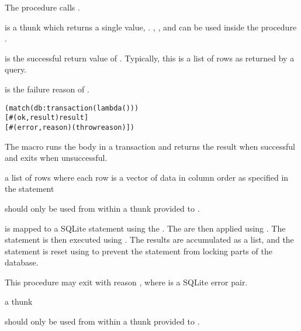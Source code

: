 The  procedure calls .

 is a thunk which returns a single value,
. , , and
 can be used inside the procedure .

 is the successful return value of . Typically,
this is a list of rows as returned by a  query.

 is the failure reason of .

\begin{syntax}
\end{syntax}
\expandsto{} \antipar\begin{alltt}
(match (db:transaction  (lambda ()  \etc))
  [#(ok ,result) result]
  [#(error ,reason) (throw reason)])
\end{alltt}

The  macro runs the body in a transaction and
returns the result when successful and exits when unsuccessful.

\begin{procedure}
\end{procedure}
\returns{}
a list of rows where each row is a vector of data in column order as
specified in the  statement

 should only be used from within a thunk 
provided to .

 is mapped to a SQLite statement using the
. The  are then applied using
. The statement is then executed using
. The results are accumulated as a list, and the
statement is reset using  to prevent the
statement from locking parts of the database.

This procedure may exit with reason , where  is a SQLite error pair.

\begin{procedure}
\end{procedure}
\returns{}
a thunk

 should only be used from within a thunk 
provided to .

